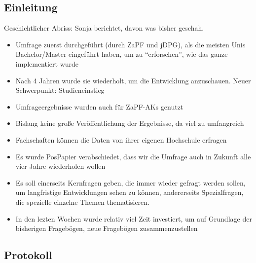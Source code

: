   \subsection*{Einleitung}
    Geschichtlicher Abriss: Sonja berichtet, davon was bisher geschah.
    \begin{itemize}
      \item Umfrage zuerst durchgeführt (durch ZaPF und jDPG), als die meisten Unis Bachelor/Master eingeführt haben, um zu “erforschen”, wie das ganze implementiert wurde
      \item Nach 4 Jahren wurde sie wiederholt, um die Entwicklung anzuschauen. Neuer Schwerpunkt: Studieneinstieg
      \item Umfrageergebnisse wurden auch für ZaPF-AKs genutzt
      \item Bislang keine große Veröffentlichung der Ergebnisse, da viel zu umfangreich
      \item Fachschaften können die Daten von ihrer eigenen Hochschule erfragen
      \item Es wurde PosPapier verabschiedet, dass wir die Umfrage auch in Zukunft alle vier Jahre wiederholen wollen
      \item Es soll einerseits Kernfragen geben, die immer wieder gefragt werden sollen, um langfristige Entwicklungen sehen zu können, andererseits Spezialfragen, die spezielle einzelne Themen thematisieren.
      \item In den lezten Wochen wurde relativ viel Zeit investiert, um auf Grundlage der bisherigen Fragebögen, neue Fragebögen zusammenzustellen
    \end{itemize}

  \subsection*{Protokoll}

